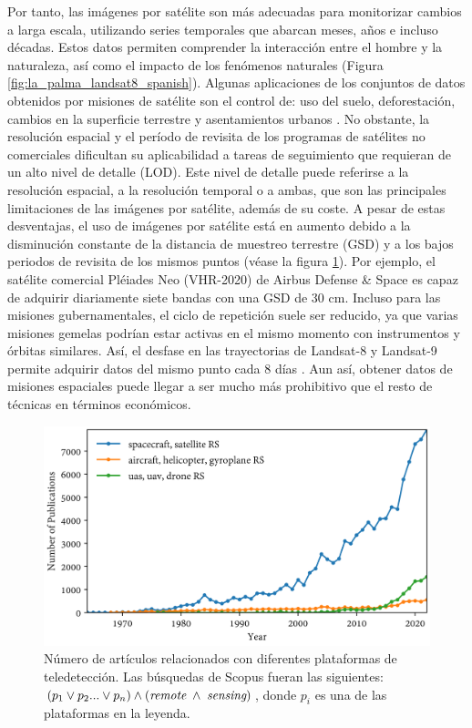 Por tanto, las imágenes por satélite son más adecuadas para monitorizar cambios a larga escala, utilizando series temporales que abarcan meses, años e incluso décadas. Estos datos permiten comprender la interacción entre el hombre y la naturaleza, así como el impacto de los fenómenos naturales (Figura \ref{fig:la_palma_landsat8_spanish}). Algunas aplicaciones de los conjuntos de datos obtenidos por misiones de satélite son el control de: uso del suelo, deforestación, cambios en la superficie terrestre y asentamientos urbanos \cite{asokan_change_2019}. No obstante, la resolución espacial y el período de revisita de los programas de satélites no comerciales dificultan su aplicabilidad a tareas de seguimiento que requieran de un alto nivel de detalle (LOD). Este nivel de detalle puede referirse a la resolución espacial, a la resolución temporal o a ambas, que son las principales limitaciones de las imágenes por satélite, además de su coste. A pesar de estas desventajas, el uso de imágenes por satélite está en aumento debido a la disminución constante de la distancia de muestreo terrestre (GSD) y a los bajos periodos de revisita de los mismos puntos (véase la figura \ref{fig:scopus_search_platforms_spanish}). Por ejemplo, el satélite comercial Pléiades Neo (VHR-2020) de Airbus Defense \& Space \cite{airbus_pleiades_2021} es capaz de adquirir diariamente siete bandas con una GSD de 30 \si{\centi\meter}. Incluso para las misiones gubernamentales, el ciclo de repetición suele ser reducido, ya que varias misiones gemelas podrían estar activas en el mismo momento con instrumentos y órbitas similares. Así, el desfase en las trayectorias de Landsat-8 y Landsat-9 permite adquirir datos del mismo punto cada 8 días \cite{masek_landsat_2020}. Aun así, obtener datos de misiones espaciales puede llegar a ser mucho más prohibitivo que el resto de técnicas en términos económicos.

\begin{figure}[!ht]
	\includegraphics[width=\linewidth]{figs/introduction/platform_timeline.png}
	\caption{Número de artículos relacionados con diferentes plataformas de teledetección. Las búsquedas de Scopus fueran las siguientes: $(p_1 \lor p_2 ... \lor p_n) \land (\textit{remote} \hspace{1mm} \land \hspace{1mm} \textit{sensing})$, donde $p_i$ es una de las plataformas en la leyenda. }
    \label{fig:scopus_search_platforms_spanish}
\end{figure}

